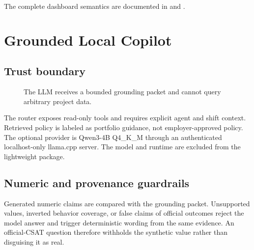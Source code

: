 \documentclass[11pt,letterpaper]{article}
\begin{document}
The complete dashboard semantics are documented in
 and .

\clearpage
\section{Grounded Local Copilot}

\subsection{Trust boundary}

\begin{figure}[ht]
\centering
{}
\caption{The LLM receives a bounded grounding packet and cannot query arbitrary project data.}
\end{figure}

The router exposes read-only tools and requires explicit agent and shift context.
Retrieved policy is labeled as portfolio guidance, not employer-approved policy. The
optional provider is Qwen3-4B Q4\_K\_M through an authenticated localhost-only
llama.cpp server. The model and runtime are excluded from the lightweight package.

\subsection{Numeric and provenance guardrails}

Generated numeric claims are compared with the grounding packet. Unsupported values,
inverted behavior coverage, or false claims of official outcomes reject the model
answer and trigger deterministic wording from the same evidence. An official-CSAT
question therefore withholds the synthetic value rather than disguising it as real.
\end{document}
